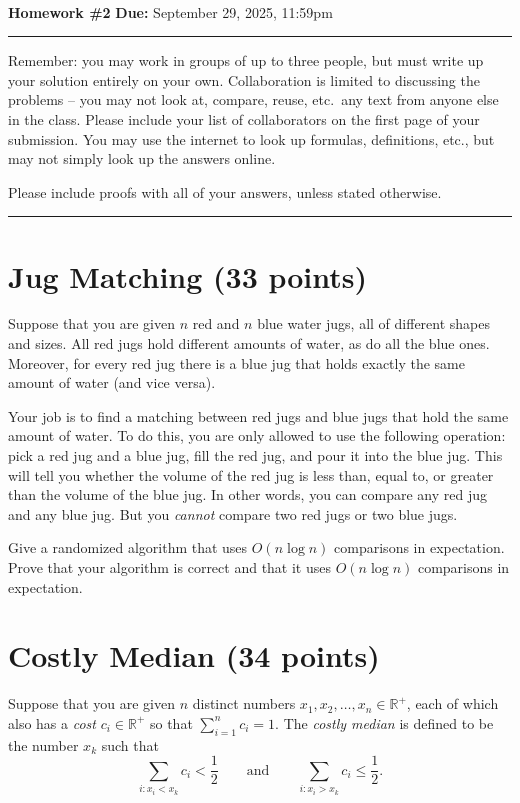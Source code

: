 \documentclass[11pt]{article}
\begin{document}
\\
{{\bf Homework \#2}} \hfill {{\bf Due:} September 29, 2025, 11:59pm} \\
\rule[0.1in]{\textwidth}{0.4pt}

Remember: you may work in groups of up to three people, but must write up your solution entirely on your own.  Collaboration is limited to discussing the problems -- you may not look at, compare, reuse, etc.~any text from anyone else in the class.  Please include your list of collaborators on the first page of your submission.  You may use the internet to look up formulas, definitions, etc., but may not simply look up the answers online.  

Please include proofs with all of your answers, unless stated otherwise.

\noindent \rule[0.1in]{\textwidth}{0.4pt}





\section{Jug Matching (33 points)}
Suppose that you are given $n$ red and $n$ blue water jugs, all of different shapes and sizes.  All red jugs hold different amounts of water, as do all the blue ones.  Moreover, for every red jug there is a blue jug that holds exactly the same amount of water (and vice versa).  

Your job is to find a matching between red jugs and blue jugs that hold the same amount of water.  To do this, you are only allowed to use the following operation: pick a red jug and a blue jug, fill the red jug, and pour it into the blue jug.  This will tell you whether the volume of the red jug is less than, equal to, or greater than the volume of the blue jug.  In other words, you can compare any red jug and any blue jug.  But you \emph{cannot} compare two red jugs or two blue jugs.  

Give a randomized algorithm that uses $O(n \log n)$ comparisons in expectation.  Prove that your algorithm is correct and that it uses $O(n \log n)$ comparisons in expectation. 


\section{Costly Median (34 points)}

Suppose that you are given $n$ distinct numbers $x_1, x_2, \dots, x_n \in \mathbb{R}^+$, each of which also has a \emph{cost} $c_i \in \mathbb{R}^+$ so that $\sum_{i=1}^n c_i = 1$.  The \emph{costly median} is defined to be the number $x_k$ such that 
\begin{equation*}
\sum_{i : x_i < x_k} c_i < \frac12 \qquad \text{and} \qquad \sum_{i : x_i > x_k} c_i \leq \frac12.
\end{equation*}
\end{document}
